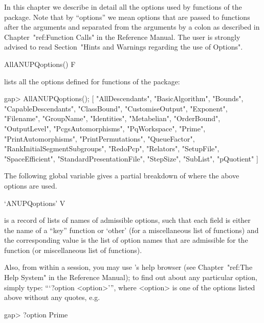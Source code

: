 

In this chapter we describe in detail all the options used  by  functions
of the {\ANUPQ} package. Note that by ``options'' we mean {\GAP}  options
that are passed to functions after the arguments and separated  from  the
arguments by a colon as described in Chapter~"ref:Function Calls" in  the
Reference Manual. The user is strongly advised to read Section~"Hints and
Warnings regarding the use of Options".

\>AllANUPQoptions() F

lists all the {\GAP}  options  defined  for  functions  of  the  {\ANUPQ}
package:

\beginexample
gap> AllANUPQoptions();
[ "AllDescendants", "BasicAlgorithm", "Bounds", "CapableDescendants", 
  "ClassBound", "CustomiseOutput", "Exponent", "Filename", "GroupName", 
  "Identities", "Metabelian", "OrderBound", "OutputLevel", 
  "PcgsAutomorphisms", "PqWorkspace", "Prime", "PrintAutomorphisms", 
  "PrintPermutations", "QueueFactor", "RankInitialSegmentSubgroups", 
  "RedoPcp", "Relators", "SetupFile", "SpaceEfficient", 
  "StandardPresentationFile", "StepSize", "SubList", "pQuotient" ]
\endexample

The following global variable gives a  partial  breakdown  of  where  the
above options are used.

\>`ANUPQoptions' V

is a record of lists of names of admissible {\ANUPQ} options, such  that
each field is either the name of a ``key'' {\ANUPQ} function  or  `other'
(for a miscellaneous list of functions) and the  corresponding  value  is
the list of option  names  that  are  admissible  for  the  function  (or
miscellaneous list of functions).

Also, from within a {\GAP} session, you may  use  {\GAP}'s  help  browser
(see Chapter~"ref:The Help System" in the {\GAP}  Reference  Manual);  to
find out about any particular {\ANUPQ} option,  simply  type:  ```?option
<option>''', where <option> is one of the options  listed  above  without
any quotes, e.g.

\begintt
gap> ?option Prime
\endtt

